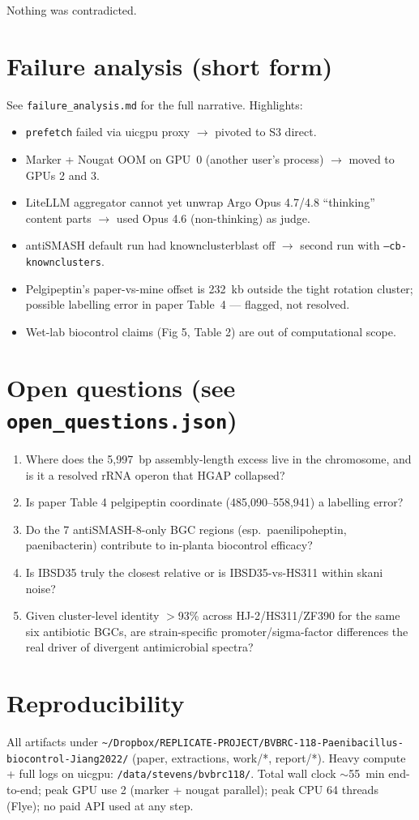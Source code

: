 \documentclass[11pt,a4paper]{article}
\begin{document}
Nothing was contradicted.

\section{Failure analysis (short form)}

See \texttt{failure\_analysis.md} for the full narrative. Highlights:
\begin{itemize}
\item \texttt{prefetch} failed via uicgpu proxy $\rightarrow$ pivoted to S3 direct.
\item Marker + Nougat OOM on GPU~0 (another user's process) $\rightarrow$ moved to
      GPUs 2 and 3.
\item LiteLLM aggregator cannot yet unwrap Argo Opus 4.7/4.8 ``thinking'' content parts
      $\rightarrow$ used Opus 4.6 (non-thinking) as judge.
\item antiSMASH default run had knownclusterblast off $\rightarrow$ second run with
      \texttt{--cb-knownclusters}.
\item Pelgipeptin's paper-vs-mine offset is 232~kb outside the tight rotation cluster;
      possible labelling error in paper Table~4 --- flagged, not resolved.
\item Wet-lab biocontrol claims (Fig 5, Table 2) are out of computational scope.
\end{itemize}

\section{Open questions (see \texttt{open\_questions.json})}

\begin{enumerate}
\item[Q1.] Where does the 5{,}997~bp assembly-length excess live in the chromosome, and
           is it a resolved rRNA operon that HGAP collapsed?
\item[Q2.] Is paper Table 4 pelgipeptin coordinate (485{,}090--558{,}941) a labelling
           error?
\item[Q3.] Do the 7 antiSMASH-8-only BGC regions (esp.\ paenilipoheptin, paenibacterin)
           contribute to in-planta biocontrol efficacy?
\item[Q4.] Is IBSD35 truly the closest relative or is IBSD35-vs-HS311 within skani
           noise?
\item[Q5.] Given cluster-level identity $>$93\% across HJ-2/HS311/ZF390 for the same six
           antibiotic BGCs, are strain-specific promoter/sigma-factor differences the real
           driver of divergent antimicrobial spectra?
\end{enumerate}

\section{Reproducibility}

All artifacts under \verb|~/Dropbox/REPLICATE-PROJECT/BVBRC-118-Paenibacillus-biocontrol-Jiang2022/|
(paper, extractions, work/*, report/*). Heavy compute + full logs on uicgpu:
\verb|/data/stevens/bvbrc118/|.
Total wall clock $\sim$55~min end-to-end;
peak GPU use 2 (marker + nougat parallel);
peak CPU 64 threads (Flye);
no paid API used at any step.
\end{document}
